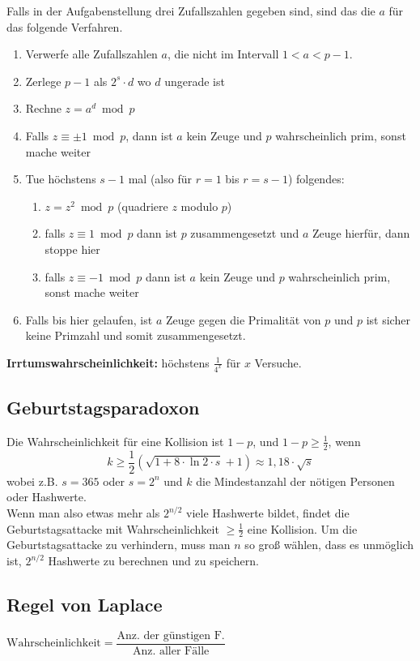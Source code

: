 \documentclass[8pt,a4paper,landscape]{article}
\begin{document}
\begin{multicols}{4}
Falls in der Aufgabenstellung drei Zufallszahlen gegeben sind, sind das die $a$ für das folgende Verfahren.
\begin{enumerate}[itemsep=1pt] 
    \item Verwerfe alle Zufallszahlen $a$, die nicht im Intervall $1 < a < p-1$.
    \item Zerlege $p-1$ als $2^{s} \cdot d$ wo $d$ ungerade ist
    \item Rechne $z = a^d \bmod p$
    \item Falls $z \equiv \pm 1 \bmod p$, dann ist $a$ kein Zeuge und $p$
          wahrscheinlich prim, sonst mache weiter
    \item Tue höchstens $s-1$ mal (also für $r=1$ bis $r=s-1$) folgendes:
          \begin{enumerate}[itemsep=1pt] 
              \item $z = z^2 \bmod p$ (quadriere $z$ modulo $p$)
              \item falls $z \equiv 1 \bmod p$ dann ist $p$ zusammengesetzt und $a$ Zeuge hierfür, dann stoppe hier
              \item falls $z \equiv -1 \bmod p$ dann ist $a$ kein Zeuge und $p$ wahrscheinlich prim, sonst mache weiter
          \end{enumerate}
    \item Falls bis hier gelaufen, ist $a$ Zeuge gegen die Primalität von
          $p$ und $p$ ist sicher keine Primzahl und somit zusammengesetzt.
\end{enumerate}
\textbf{Irrtumswahrscheinlichkeit:} höchstens $\frac{1}{4^x}$ für $x$ Versuche.

\subsection{Geburtstagsparadoxon}
Die Wahrscheinlichkeit für eine Kollision ist $1-p$, und $1-p \geq \frac{1}{2}$, wenn 
\[
k \geq  \frac{1}{2} \left( \sqrt{1 + 8 \cdot \ln 2 \cdot s} + 1 \right) \approx 1,18 \cdot \sqrt{s}  
\]
wobei z.B. $s=365$ oder $s=2^n$ und $k$ die Mindestanzahl der nötigen Personen oder Hashwerte. \\
Wenn man also etwas mehr als $2^{n/2}$ viele Hashwerte bildet, findet die Geburtstagsattacke mit Wahrscheinlichkeit $\geq \frac{1}{2}$ eine Kollision. Um die Geburtstagsattacke zu verhindern, muss man $n$ so groß wählen, dass es unmöglich ist, $2^{n/2}$ Hashwerte zu berechnen und zu speichern.
\subsection{Regel von Laplace}
$\textrm{Wahrscheinlichkeit} = \dfrac{\textrm{Anz. der günstigen F.}}{\textrm{Anz. aller Fälle}}$


\end{multicols}
\end{document}
